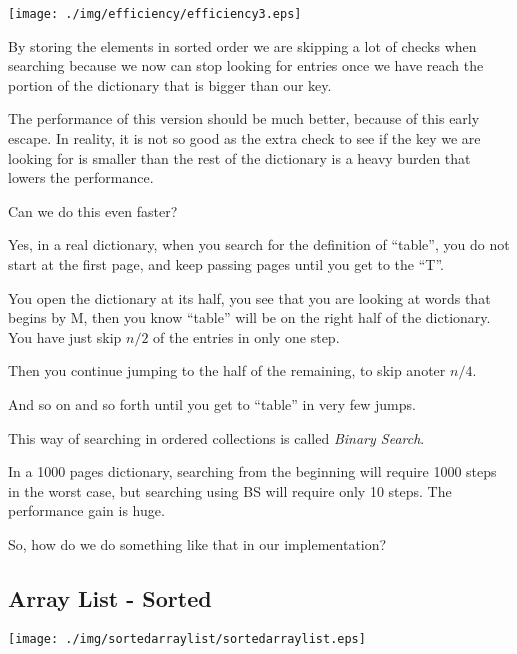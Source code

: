 \documentclass[a4paper, 9pt]{extarticle}
\begin{document}
\begin{multicols}{2}
\begin{center}
  \texttt{[image: ./img/efficiency/efficiency3.eps]}
\end{center}
\columnbreak

By storing the elements in sorted order we are skipping a lot of checks when
searching because we now can stop looking for entries once we have reach the
portion of the dictionary that is bigger than our key.

The performance of this version should be much better, because of this early
escape. In reality, it is not so good as the extra check to see if the key we
are looking for is smaller than the rest of the dictionary is a heavy burden
that lowers the performance.

Can we do this even faster?

Yes, in a real dictionary, when you search for the definition of ``table'', you
do not start at the first page, and keep passing pages until you get to the
``T''.

You open the dictionary at its half, you see that you are looking at words that
begins by M, then you know ``table'' will be on the right half of the
dictionary. You have just skip $n/2$ of the entries in only one step.

Then you continue jumping to the half of the remaining, to skip anoter $n/4$.

And so on and so forth until you get to ``table'' in very few jumps.

This way of searching in ordered collections is called \emph{Binary Search}.

In a 1000 pages dictionary, searching from the beginning will require 1000
steps in the worst case, but searching using BS will require only 10 steps. The
performance gain is huge.

So, how do we do something like that in our implementation?
\end{multicols}



\newpage

\subsection{Array List - Sorted}

\begin{center}
  \texttt{[image: ./img/sortedarraylist/sortedarraylist.eps]}
\end{center}
\end{document}
